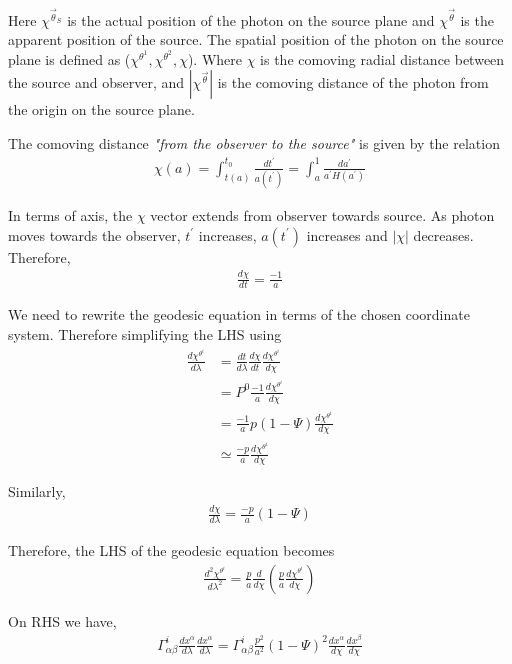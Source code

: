 \documentclass[12pt]{article}
\newcommand{\beqa}{\begin{eqnarray}}
\newcommand{\eeqa}{\end{eqnarray}}
\numberwithin{equation}{section}
\begin{document}
Here $\chi ^{\vec{\theta}_S}$ is the actual position of the photon on the source plane and $\chi^{\vec{\theta}}$ is the apparent position of the source. The spatial position of the photon on the source plane is defined as ($\chi^{\theta^1}, \chi^{\theta^2}, \chi$). Where $\chi$ is the comoving radial distance between the source and observer, and $|\chi^{\vec{\theta}}|$  is the comoving distance of the photon from the origin on the source plane.

The comoving distance \textit{"from the observer to the source"} is given by the relation
\beqa
\chi(a) = \int_{t(a)}^{t_0} \frac{dt^\prime}{a(t^\prime)} = \int_{a}^{1} \frac{da^\prime}{a^\prime H(a^\prime)}
\eeqa

In terms of axis, the $\chi$ vector extends from observer towards source. As photon moves towards the observer, $t^\prime$ increases, $a(t^\prime)$ increases and $|\chi|$ decreases. Therefore, 
\beqa
\frac{d\chi}{dt} = \frac{-1}{a}
\eeqa

We need to rewrite the geodesic equation in terms of the chosen coordinate system. Therefore simplifying the LHS using 
\begin{equation}
\begin{aligned}
\frac{d\chi^{\theta^i}}{d\lambda} &= \frac{dt}{d\lambda} \frac{d\chi}{dt} \frac{d\chi^{\theta^i}}{d\chi} 
\\
& = P^0 \frac{-1}{a} \frac{d\chi^{\theta^i}}{d\chi}
\\
& = \frac{-1}{a} p (1-\Psi) \frac{d \chi^{\theta^i}}{d\chi} \\
& \simeq \frac{-p}{a} \frac{d\chi^{\theta^i}}{d\chi} 
\end{aligned} 
\end{equation}

Similarly, 
\beqa
\frac{d\chi}{d\lambda} = \frac{-p}{a} (1-\Psi)
\label{eq:zero_order_p_a}
\eeqa

Therefore, the LHS of the geodesic equation becomes
\begin{equation}
\begin{aligned}
\frac{d^2\chi^{\theta^i}}{d\lambda^2}  = \frac{p}{a} \frac{d}{d\chi}\left( \frac{p}{a}  \frac{d\chi^{\theta^i}}{d\chi}\right)
\end{aligned}
\end{equation}

On RHS we have,
\begin{equation}
\begin{aligned}
\Gamma^{i}_{\alpha \beta} \frac{dx^{\alpha}}{d\lambda}\frac{dx^{\alpha}}{d\lambda} =  \Gamma^{i}_{\alpha \beta}\frac{p^2}{a^2} (1 - \Psi)^2 \frac{dx^\alpha}{d\chi}\frac{dx^\beta}{d\chi} 
\end{aligned}
\end{equation}
\end{document}
